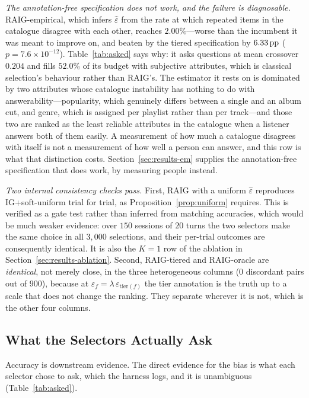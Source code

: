 \emph{The annotation-free specification does not work, and the failure is
diagnosable.} RAIG-empirical, which infers $\hat\varepsilon$ from the rate at
which repeated items in the catalogue disagree with each other, reaches
$2.00\%$---worse than the incumbent it was meant to improve on, and beaten by
the tiered specification by $6.33\,\text{pp}$
($p = 7.6\times10^{-12}$). Table~\ref{tab:asked} says why: it asks questions at
mean crossover $0.204$ and fills $52.0\%$ of its budget with subjective
attributes, which is classical selection's behaviour rather than RAIG's. The
estimator it rests on is dominated by two attributes whose catalogue
instability has nothing to do with answerability---popularity, which genuinely
differs between a single and an album cut, and genre, which is assigned per
playlist rather than per track---and those two are ranked as the least reliable
attributes in the catalogue when a listener answers both of them easily. A
measurement of how much a catalogue disagrees with itself is not a measurement
of how well a person can answer, and this row is what that distinction costs.
Section~\ref{sec:results-em} supplies the annotation-free specification that
does work, by measuring people instead.

\emph{Two internal consistency checks pass.} First, RAIG with a uniform
$\hat\varepsilon$ reproduces IG+soft-uniform trial for trial, as
Proposition~\ref{prop:uniform} requires. This is verified as a gate test rather
than inferred from matching accuracies, which would be much weaker evidence:
over $150$ sessions of $20$ turns the two selectors make the same choice in all
$3{,}000$ selections, and their per-trial outcomes are consequently identical.
It is also the $K=1$ row of the ablation in
Section~\ref{sec:results-ablation}. Second, RAIG-tiered and RAIG-oracle are
\emph{identical}, not merely close, in the three heterogeneous columns ($0$
discordant pairs out of $900$), because at $\varepsilon_f = \lambda\,
\varepsilon_{\mathrm{tier}(f)}$ the tier annotation is the truth up to a scale
that does not change the ranking. They separate wherever it is not, which is
the other four columns.

\subsection{What the Selectors Actually Ask}
\label{sec:results-behaviour}

Accuracy is downstream evidence. The direct evidence for the bias is what each
selector chose to ask, which the harness logs, and it is unambiguous
(Table~\ref{tab:asked}).

